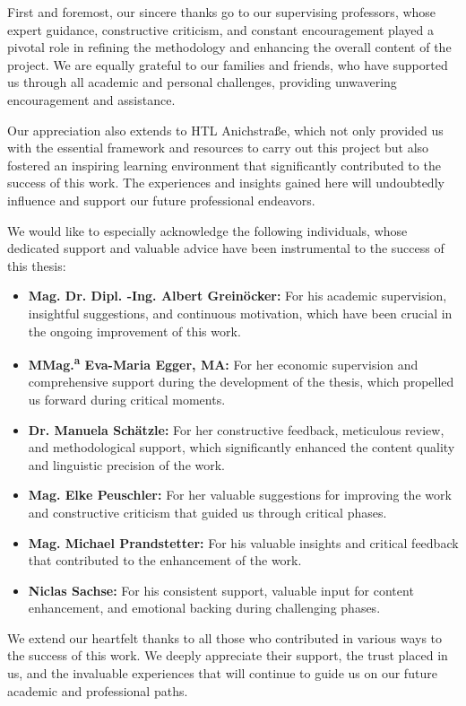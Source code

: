 First and foremost, our sincere thanks go to our supervising professors, whose expert guidance, constructive criticism, and constant encouragement played a pivotal role in refining the methodology and enhancing the overall content of the project. We are equally grateful to our families and friends, who have supported us through all academic and personal challenges, providing unwavering encouragement and assistance.

Our appreciation also extends to HTL Anichstraße, which not only provided us with the essential framework and resources to carry out this project but also fostered an inspiring learning environment that significantly contributed to the success of this work. The experiences and insights gained here will undoubtedly influence and support our future professional endeavors.

We would like to especially acknowledge the following individuals, whose dedicated support and valuable advice have been instrumental to the success of this thesis:
\begin{itemize}
    \item \textbf{Mag. Dr. Dipl. -Ing. Albert Greinöcker:} For his academic supervision, insightful suggestions, and continuous motivation, which have been crucial in the ongoing improvement of this work.
    \item \textbf{MMag.\textsuperscript{a} Eva-Maria Egger, MA:} For her economic supervision and comprehensive support during the development of the thesis, which propelled us forward during critical moments.
    \item \textbf{Dr. Manuela Schätzle:} For her constructive feedback, meticulous review, and methodological support, which significantly enhanced the content quality and linguistic precision of the work.
    \item \textbf{Mag. Elke Peuschler:} For her valuable suggestions for improving the work and constructive criticism that guided us through critical phases.
    \item \textbf{Mag. Michael Prandstetter:} For his valuable insights and critical feedback that contributed to the enhancement of the work.
    \item \textbf{Niclas Sachse:} For his consistent support, valuable input for content enhancement, and emotional backing during challenging phases.
\end{itemize}


We extend our heartfelt thanks to all those who contributed in various ways to the success of this work. We deeply appreciate their support, the trust placed in us, and the invaluable experiences that will continue to guide us on our future academic and professional paths.

